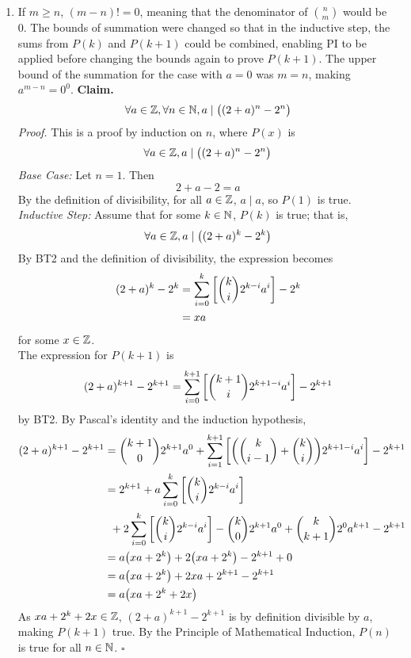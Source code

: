 \documentclass[../MATH135.tex]{subfiles}
\begin{document}
		\begin{enumerate}
			\item
				\begin{tasks}
					\task	
						If \(m \ge n\), \((m - n)! = 0\), meaning that the denominator of \(\binom{n}{m}\) would be 0.
					\task
						The bounds of summation were changed so that in the inductive step, the sums from \(P(k)\) and \(P(k + 1)\) could be combined, enabling PI to be applied before changing the bounds again to prove \(P(k + 1)\).
					\task
						The upper bound of the summation for the case with \(a = 0\) was \(m = n\), making \(a^{m - n} = 0^0\).
					\task
						\textbf{Claim.} \[\forall a \in \mathbb{Z}, \forall n \in \mathbb{N}, a \mid \bigl((2 + a)^n - 2^n\bigr)\]
						\textit{Proof.}
							This is a proof by induction on \(n\), where \(P(x)\) is
								\[\forall a \in \mathbb{Z}, a \mid \bigl((2 + a)^n - 2^n\bigr)\]
							\textit{Base Case:} Let \(n = 1\). Then
								\[2 + a - 2 = a\]
								By the definition of divisibility, for all \(a \in \mathbb{Z}\), \(a \mid a\), so \(P(1)\) is true. \\
							\textit{Inductive Step:} Assume that for some \(k \in \mathbb{N}\), \(P(k)\) is true; that is,
								\[\forall a \in \mathbb{Z}, a \mid \bigl((2 + a)^k - 2^k\bigr)\]
								By BT2 and the definition of divisibility, the expression becomes
								\begin{align*}
									(2 + a)^k - 2^k &= \sum_{i = 0}^k\qty[\binom{k}{i}2^{k - i}a^i] - 2^k \\
										&= xa
								\end{align*}
								for some \(x \in \mathbb{Z}\). \\
								The expression for \(P(k + 1)\) is
								\[(2 + a)^{k + 1} - 2^{k + 1} = \sum_{i = 0}^{k + 1}\qty[\binom{k + 1}{i}2^{k + 1 - i}a^i] - 2^{k + 1}\]
								by BT2. By Pascal's identity and the induction hypothesis,
								\begin{align*}
									(2 + a)^{k + 1} - 2^{k + 1} &= \binom{k + 1}{0}2^{k + 1}a^0 + \sum_{i = 1}^{k + 1}\qty[\qty(\binom{k}{i - 1} + \binom{k}{i})2^{k + 1 - i}a^i] - 2^{k + 1} \\
										&= 2^{k + 1} + a\sum_{i = 0}^{k}\qty[\binom{k}{i}2^{k - i}a^i] \\
											&\,\,\,+ 2\sum_{i = 0}^k\qty[\binom{k}{i}2^{k - i}a^i] - \binom{k}{0}2^{k + 1}a^0 + \binom{k}{k + 1}2^0a^{k + 1} - 2^{k + 1} \\
										&= a\qty(xa + 2^k) + 2\qty(xa + 2^k) - 2^{k + 1} + 0  \\
										&= a\qty(xa + 2^k) + 2xa + 2^{k + 1} - 2^{k + 1} \\
										&= a\qty(xa + 2^k + 2x)
								\end{align*}
								As \(xa + 2^k + 2x \in \mathbb{Z}\), \((2 + a)^{k + 1} - 2^{k + 1}\) is by definition divisible by \(a\), making \(P(k + 1)\) true. By the Principle of Mathematical Induction, \(P(n)\) is true for all \(n \in \mathbb{N}\). \(\square\) \\
							

\end{tasks}
\end{enumerate}
\end{document}

